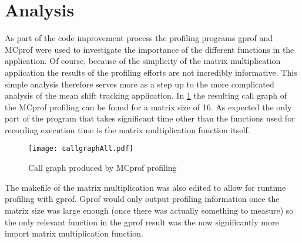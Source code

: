 \documentclass[final]{article}
\begin{document}
\section{Analysis}
As part of the code improvement process the profiling programs gprof and MCprof were used to investigate the importance of the different functions in the application. Of course, because of the simplicity of the matrix multiplication application the results of the profiling efforts are not incredibly informative. This simple analysis therefore serves more as a step up to the more complicated analysis of the mean shift tracking application. In \cref{fig:callgraphall} the resulting call graph of the MCprof profiling can be found for a matrix size of 16. As expected the only part of the program that takes significant time other than the functions used for recording execution time is the matrix multiplication function itself. 
\begin{figure}[H]
\centering
\texttt{[image: callgraphAll.pdf]}
\caption{Call graph produced by MCprof profiling}
\label{fig:callgraphall}
\end{figure}
The makefile of the matrix multiplication was also edited to allow for runtime profiling with gprof. Gprof would only output profiling information once the matrix size was large enough (once there was actually something to measure) so the only relevant function in the gprof result was the now significantly more import matrix multiplication function.
\end{document}
